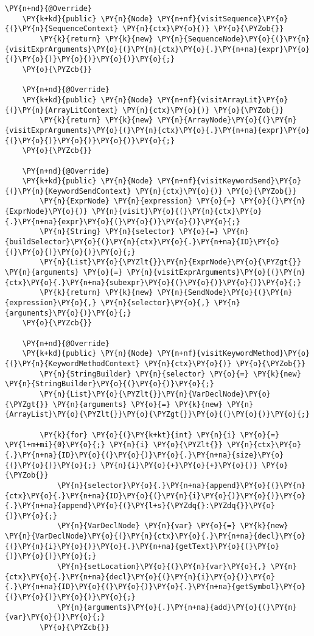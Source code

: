 \begin{Verbatim}[commandchars=\\\{\}]
    \PY{n+nd}{@Override}
    \PY{k+kd}{public} \PY{n}{Node} \PY{n+nf}{visitSequence}\PY{o}{(}\PY{n}{SequenceContext} \PY{n}{ctx}\PY{o}{)} \PY{o}{\PYZob{}}
        \PY{k}{return} \PY{k}{new} \PY{n}{SequenceNode}\PY{o}{(}\PY{n}{visitExprArguments}\PY{o}{(}\PY{n}{ctx}\PY{o}{.}\PY{n+na}{expr}\PY{o}{(}\PY{o}{)}\PY{o}{)}\PY{o}{)}\PY{o}{;}
    \PY{o}{\PYZcb{}}

    \PY{n+nd}{@Override}
    \PY{k+kd}{public} \PY{n}{Node} \PY{n+nf}{visitArrayLit}\PY{o}{(}\PY{n}{ArrayLitContext} \PY{n}{ctx}\PY{o}{)} \PY{o}{\PYZob{}}
        \PY{k}{return} \PY{k}{new} \PY{n}{ArrayNode}\PY{o}{(}\PY{n}{visitExprArguments}\PY{o}{(}\PY{n}{ctx}\PY{o}{.}\PY{n+na}{expr}\PY{o}{(}\PY{o}{)}\PY{o}{)}\PY{o}{)}\PY{o}{;}
    \PY{o}{\PYZcb{}}

    \PY{n+nd}{@Override}
    \PY{k+kd}{public} \PY{n}{Node} \PY{n+nf}{visitKeywordSend}\PY{o}{(}\PY{n}{KeywordSendContext} \PY{n}{ctx}\PY{o}{)} \PY{o}{\PYZob{}}
        \PY{n}{ExprNode} \PY{n}{expression} \PY{o}{=} \PY{o}{(}\PY{n}{ExprNode}\PY{o}{)} \PY{n}{visit}\PY{o}{(}\PY{n}{ctx}\PY{o}{.}\PY{n+na}{expr}\PY{o}{(}\PY{o}{)}\PY{o}{)}\PY{o}{;}
        \PY{n}{String} \PY{n}{selector} \PY{o}{=} \PY{n}{buildSelector}\PY{o}{(}\PY{n}{ctx}\PY{o}{.}\PY{n+na}{ID}\PY{o}{(}\PY{o}{)}\PY{o}{)}\PY{o}{;}
        \PY{n}{List}\PY{o}{\PYZlt{}}\PY{n}{ExprNode}\PY{o}{\PYZgt{}} \PY{n}{arguments} \PY{o}{=} \PY{n}{visitExprArguments}\PY{o}{(}\PY{n}{ctx}\PY{o}{.}\PY{n+na}{subexpr}\PY{o}{(}\PY{o}{)}\PY{o}{)}\PY{o}{;}
        \PY{k}{return} \PY{k}{new} \PY{n}{SendNode}\PY{o}{(}\PY{n}{expression}\PY{o}{,} \PY{n}{selector}\PY{o}{,} \PY{n}{arguments}\PY{o}{)}\PY{o}{;}
    \PY{o}{\PYZcb{}}

    \PY{n+nd}{@Override}
    \PY{k+kd}{public} \PY{n}{Node} \PY{n+nf}{visitKeywordMethod}\PY{o}{(}\PY{n}{KeywordMethodContext} \PY{n}{ctx}\PY{o}{)} \PY{o}{\PYZob{}}
        \PY{n}{StringBuilder} \PY{n}{selector} \PY{o}{=} \PY{k}{new} \PY{n}{StringBuilder}\PY{o}{(}\PY{o}{)}\PY{o}{;}
        \PY{n}{List}\PY{o}{\PYZlt{}}\PY{n}{VarDeclNode}\PY{o}{\PYZgt{}} \PY{n}{arguments} \PY{o}{=} \PY{k}{new} \PY{n}{ArrayList}\PY{o}{\PYZlt{}}\PY{o}{\PYZgt{}}\PY{o}{(}\PY{o}{)}\PY{o}{;}

        \PY{k}{for} \PY{o}{(}\PY{k+kt}{int} \PY{n}{i} \PY{o}{=} \PY{l+m+mi}{0}\PY{o}{;} \PY{n}{i} \PY{o}{\PYZlt{}} \PY{n}{ctx}\PY{o}{.}\PY{n+na}{ID}\PY{o}{(}\PY{o}{)}\PY{o}{.}\PY{n+na}{size}\PY{o}{(}\PY{o}{)}\PY{o}{;} \PY{n}{i}\PY{o}{+}\PY{o}{+}\PY{o}{)} \PY{o}{\PYZob{}}
            \PY{n}{selector}\PY{o}{.}\PY{n+na}{append}\PY{o}{(}\PY{n}{ctx}\PY{o}{.}\PY{n+na}{ID}\PY{o}{(}\PY{n}{i}\PY{o}{)}\PY{o}{)}\PY{o}{.}\PY{n+na}{append}\PY{o}{(}\PY{l+s}{\PYZdq{}:\PYZdq{}}\PY{o}{)}\PY{o}{;}
            \PY{n}{VarDeclNode} \PY{n}{var} \PY{o}{=} \PY{k}{new} \PY{n}{VarDeclNode}\PY{o}{(}\PY{n}{ctx}\PY{o}{.}\PY{n+na}{decl}\PY{o}{(}\PY{n}{i}\PY{o}{)}\PY{o}{.}\PY{n+na}{getText}\PY{o}{(}\PY{o}{)}\PY{o}{)}\PY{o}{;}
            \PY{n}{setLocation}\PY{o}{(}\PY{n}{var}\PY{o}{,} \PY{n}{ctx}\PY{o}{.}\PY{n+na}{decl}\PY{o}{(}\PY{n}{i}\PY{o}{)}\PY{o}{.}\PY{n+na}{ID}\PY{o}{(}\PY{o}{)}\PY{o}{.}\PY{n+na}{getSymbol}\PY{o}{(}\PY{o}{)}\PY{o}{)}\PY{o}{;}
            \PY{n}{arguments}\PY{o}{.}\PY{n+na}{add}\PY{o}{(}\PY{n}{var}\PY{o}{)}\PY{o}{;}
        \PY{o}{\PYZcb{}}


\end{Verbatim}
